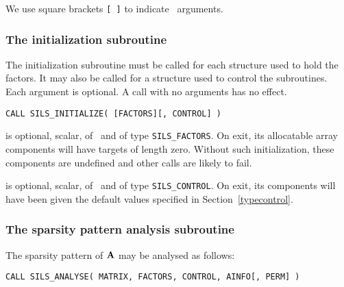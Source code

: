 \documentclass{galahad}
\newcommand{\packagename}{SILS}
\begin{document}

\galarguments
We use square brackets {\tt [ ]} to indicate \optional\ arguments.


\subsubsection{The initialization subroutine}\label{subinit}
The initialization subroutine must be called for each structure used 
to hold the factors. It may also be called for a structure used to 
control the subroutines. Each argument is optional. A call with no 
arguments has no effect. 

\hskip0.5in 
{\tt CALL \packagename\_INITIALIZE( [FACTORS][, CONTROL] )}

\begin{description}

 is optional, scalar, of \intentout\ and of type 
{\tt \packagename\_FACTORS}. On exit, its allocatable array components will have 
targets of length zero.  Without such initialization, these components 
are undefined and other calls are likely to fail. 
 
 is optional, scalar, of \intentout\ and of type 
{\tt \packagename\_CONTROL}. On exit, its components will have been 
given the default values specified in Section~\ref{typecontrol}. 

\end{description}


\subsubsection{The sparsity pattern analysis subroutine}
The sparsity pattern of ${\mathbf{A}}$ may be analysed as follows:

\hskip0.5in 
{\tt CALL \packagename\_ANALYSE( MATRIX, FACTORS, CONTROL, AINFO[, PERM] )}
\end{document}
